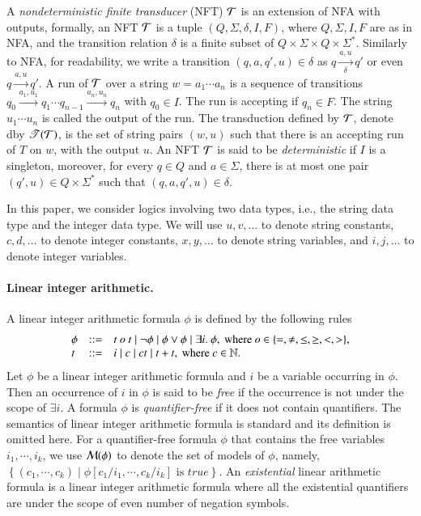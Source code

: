 A \emph{nondeterministic finite transducer} (NFT) $\mathcal{T}$ is an extension of NFA with outputs, formally, an NFT $\mathcal{T}$ is a tuple $(Q, \Sigma, \delta, I, F)$, where $Q, \Sigma, I, F$ are as in NFA, and the transition relation $\delta$ is a finite subset of $Q \times \Sigma \times Q \times \Sigma^*$. Similarly to NFA, for readability, we write a transition $(q, a, q', u) \in \delta$ as $q \xrightarrow[\delta]{a, u} q'$ or even $q \xrightarrow{a, u} q'$. 
%
A run of $\mathcal{T}$ over a string $w=a_1 \cdots a_n$ is a sequence of transitions $q_0 \xrightarrow{a_1, u_1} q_1 \cdots q_{n-1} \xrightarrow{a_n, u_n} q_n$ with $q_0 \in I$. The run is accepting if $q_n \in F$. The string $u_1 \cdots u_n$ is called the output of the run. The transduction defined by $\mathcal{T}$, denote dby $\mathscr{T}(\mathcal{T})$, is the set of string pairs $(w, u)$ such that there is an accepting run of $T$ on $w$, with the output $u$. An NFT $\mathcal{T}$ is said to be \emph{deterministic} if $I$ is a singleton, moreover, for every $q \in Q$ and $a \in \Sigma$, there is at most one pair $(q', u) \in Q \times \Sigma^*$ such that $(q, a, q', u) \in \delta$.


\medskip

In this paper, we consider logics involving two data types, i.e., the string data type and the integer data type. We will use $u, v, \dots$ to denote string constants,  $c, d,\dots$ to denote integer constants, $x, y, \dots$ to denote string variables, and $i, j, \dots$ to denote  integer variables.


\paragraph*{Linear integer arithmetic.}  A linear integer arithmetic formula $\phi$ is defined by the following rules
\[
\begin{array}{l c l}
\phi &::= & t \ o \ t \mid \neg \phi \mid \phi \vee \phi \mid \exists i.\ \phi, \mbox{ where } o \in \{=, \neq, \le, \ge, <, >\},\\
t & ::=  & i \mid c \mid ct \mid t + t, \mbox{ where } c \in \mathbb{N}.
\end{array}
\]
Let $\phi$ be a linear integer arithmetic formula and $i$ be a variable occurring in $\phi$. Then an occurrence of $i$ in $\phi$ is said to be \emph{free}  if the occurrence is not under the scope of $\exists i$. A formula $\phi$ is \emph{quantifier-free} if it does not contain quantifiers. The semantics of linear integer arithmetic formula is standard and its definition is omitted here.
For a quantifier-free formula $\phi$ that contains the free variables $i_1, \cdots, i_k$, we use $\mathcal{M}(\phi)$ to denote the set of models of $\phi$, namely, $\left\{(c_1, \cdots ,c_k) \mid \phi[c_1/i_1, \cdots, c_k/i_k] \mbox{ is } true\right\}$. An \emph{existential} linear arithmetic formula is a linear integer arithmetic formula where all the existential quantifiers are under the scope of even number of negation symbols.
